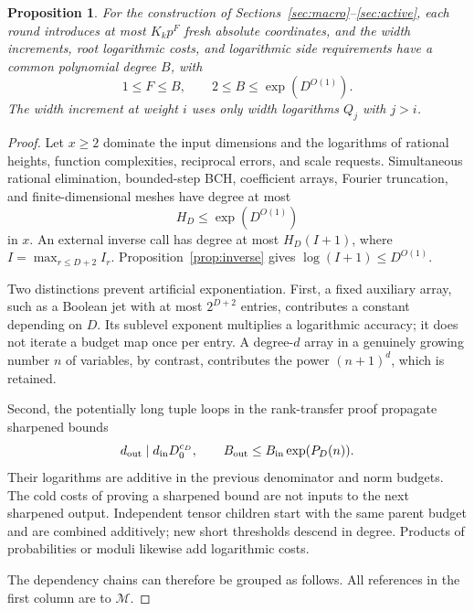 \documentclass[11pt,a4paper]{article}
\newtheorem{proposition}[theorem]{Proposition}
\theoremstyle{definition}
\newcommand{\M}{\mathcal M}
\begin{document}
\begin{proposition}\label{prop:local}
For the construction of Sections~\ref{sec:macro}--\ref{sec:active},
each round introduces at most \(K_kp^F\) fresh absolute
coordinates, and the width increments, root logarithmic
costs, and logarithmic side requirements have a common
polynomial degree \(B\), with
\begin{equation}\label{eq:FB}
 1\le F\le B,\qquad 2\le B\le\exp(D^{O(1)}).
\end{equation}
The width increment at weight \(i\) uses only
width logarithms \(Q_j\) with \(j>i\).
\end{proposition}

\begin{proof}
Let \(x\ge2\) dominate the input dimensions and the
logarithms of rational heights, function complexities,
reciprocal errors, and scale requests. Simultaneous
rational elimination, bounded-step BCH, coefficient
arrays, Fourier truncation, and finite-dimensional
meshes have degree at most
\[
 H_D\le\exp(D^{O(1)})
\]
in \(x\). An external inverse call has degree at most
\(H_D(I+1)\), where
\(I=\max_{r\le D+2}I_r\).
Proposition~\ref{prop:inverse} gives
\(\log(I+1)\le D^{O(1)}\).

Two distinctions prevent artificial exponentiation.
First, a fixed auxiliary array, such as a Boolean
jet with at most \(2^{D+2}\) entries, contributes a
constant depending on \(D\). Its sublevel exponent
multiplies a logarithmic accuracy; it does not
iterate a budget map once per entry. A degree-\(d\)
array in a genuinely growing number \(n\) of
variables, by contrast, contributes the power
\((n+1)^d\), which is retained.

Second, the potentially long tuple loops in the
rank-transfer proof propagate sharpened bounds
\[
 d_{\rm out}\mid d_{\rm in}D_0^{c_D},\qquad
 B_{\rm out}\le B_{\rm in}\exp(P_D(n)).
\]
Their logarithms are additive in the previous
denominator and norm budgets. The cold costs of
proving a sharpened bound are not inputs to the
next sharpened output. Independent tensor children
start with the same parent budget and are combined
additively; new short thresholds descend in degree.
Products of probabilities or moduli likewise add
logarithmic costs.

The dependency chains can therefore be grouped as
follows. All references in the first column are to
\(\M\).


\end{proof}
\end{document}
